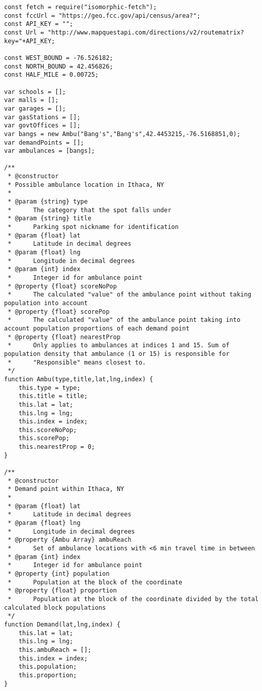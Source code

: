\documentclass{article}
\newenvironment{code}{\captionsetup{type=listing}}{}
\begin{document}
\begin{code}
\begin{verbatim}
const fetch = require("isomorphic-fetch");
const fccUrl = "https://geo.fcc.gov/api/census/area?";
const API_KEY = "";
const Url = "http://www.mapquestapi.com/directions/v2/routematrix?key="+API_KEY;

const WEST_BOUND = -76.526182;
const NORTH_BOUND = 42.456826;
const HALF_MILE = 0.00725;

var schools = [];
var malls = [];
var garages = [];
var gasStations = [];
var govtOffices = [];
var bangs = new Ambu("Bang's","Bang's",42.4453215,-76.5168851,0);
var demandPoints = [];
var ambulances = [bangs];

/**
 * @constructor
 * Possible ambulance location in Ithaca, NY
 * 
 * @param {string} type
 *      The category that the spot falls under 
 * @param {string} title 
 *      Parking spot nickname for identification
 * @param {float} lat 
 *      Latitude in decimal degrees
 * @param {float} lng 
 *      Longitude in decimal degrees
 * @param {int} index
 *      Integer id for ambulance point
 * @property {float} scoreNoPop
 *      The calculated "value" of the ambulance point without taking population into account
 * @property {float} scorePop
 *      The calculated "value" of the ambulance point taking into account population proportions of each demand point
 * @property {float} nearestProp
 *      Only applies to ambulances at indices 1 and 15. Sum of population density that ambulance (1 or 15) is responsible for
 *      "Responsible" means closest to.
 */
function Ambu(type,title,lat,lng,index) {
    this.type = type;
    this.title = title;
    this.lat = lat;
    this.lng = lng;
    this.index = index;
    this.scoreNoPop;
    this.scorePop;
    this.nearestProp = 0;
}

/**
 * @constructor
 * Demand point within Ithaca, NY
 * 
 * @param {float} lat
 *      Latitude in decimal degrees
 * @param {float} lng
 *      Longitude in decimal degrees
 * @property {Ambu Array} ambuReach
 *      Set of ambulance locations with <6 min travel time in between
 * @param {int} index
 *      Integer id for ambulance point
 * @property {int} population
 *      Population at the block of the coordinate
 * @property {float} proportion
 *      Population at the block of the coordinate divided by the total calculated block populations
 */
function Demand(lat,lng,index) {
    this.lat = lat;
    this.lng = lng;
    this.ambuReach = [];
    this.index = index;
    this.population;
    this.proportion;
}


\end{verbatim}
\end{code}
\end{document}
